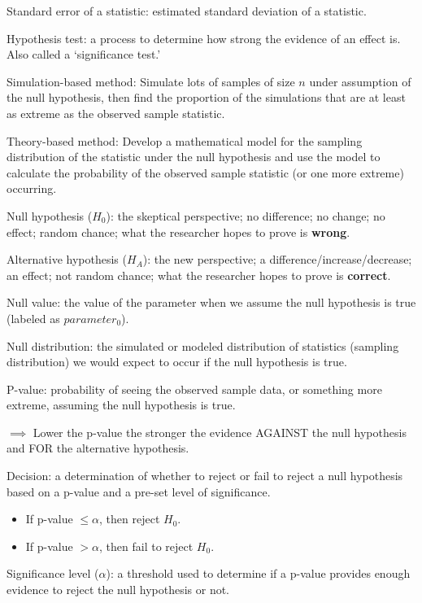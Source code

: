 \documentclass[
]{report}
\begin{document}
Standard error of a statistic: estimated standard deviation of a statistic.

Hypothesis test: a process to determine how strong the evidence of an effect is. Also called a `significance test.'

Simulation-based method: Simulate lots of samples of size \(n\) under assumption of the null hypothesis, then find the proportion of the simulations that are at least as extreme as the observed sample statistic.

Theory-based method: Develop a mathematical model for the sampling distribution of the statistic under the null hypothesis and use the model to calculate the probability of the observed sample statistic (or one more extreme) occurring.

Null hypothesis (\(H_0\)): the skeptical perspective; no difference; no change; no effect; random chance; what the researcher hopes to prove is \textbf{wrong}.

Alternative hypothesis (\(H_A\)): the new perspective; a difference/increase/decrease; an effect; not random chance; what the researcher hopes to prove is \textbf{correct}.

Null value: the value of the parameter when we assume the null hypothesis is true (labeled as \(parameter_0\)).

Null distribution: the simulated or modeled distribution of statistics (sampling distribution) we would expect to occur if the null hypothesis is true.

P-value: probability of seeing the observed sample data, or something more extreme, assuming the null hypothesis is true.

\(\implies\) Lower the p-value the stronger the evidence AGAINST the null hypothesis and FOR the alternative hypothesis.

Decision: a determination of whether to reject or fail to reject a null hypothesis based on a p-value and a pre-set level of significance.

\begin{itemize}
\item
  If p-value \(\leq \alpha\), then reject \(H_0\).
\item
  If p-value \(> \alpha\), then fail to reject \(H_0\).
\end{itemize}

Significance level (\(\alpha\)): a threshold used to determine if a p-value provides enough evidence to reject the null hypothesis or not.
\end{document}
